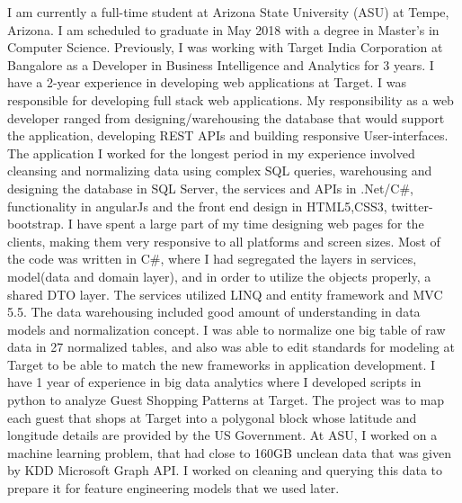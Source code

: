 \documentclass[11pt, a4paper]{awesome-cv}
\begin{document}
\makecvheader

\makelettertitle

\begin{cvletter}
I am currently a full-time student at Arizona State University (ASU) at Tempe, Arizona. I am scheduled to graduate in May 2018 with a degree in Master’s in Computer Science.
Previously, I was working with Target India Corporation at Bangalore as a Developer in Business Intelligence and Analytics for 3 years.
I have a 2-year experience in developing web applications at Target. I was responsible for developing full stack web applications.
My responsibility as a web developer ranged from designing/warehousing the database that would support the application, developing REST APIs and building responsive User-interfaces. The application I worked for the longest period
in my experience involved cleansing and normalizing data using complex SQL queries, warehousing and designing the database in SQL Server, the services and APIs in .Net/C\#, functionality in angularJs and the front end design in 
HTML5,CSS3, twitter-bootstrap. I have spent a large part of my time designing web pages for the clients, making them very responsive to all platforms and screen sizes. Most of the code was written in C\#, where I had segregated the 
layers in services, model(data and domain layer), and in order to utilize the objects properly, a shared DTO layer. The services utilized LINQ and entity framework and MVC 5.5.
The data warehousing included good amount of understanding in data models and normalization concept. I was able to normalize one big table of raw data in 27 normalized tables, and also was able to edit standards for modeling at 
Target to be able to match the new frameworks in application development.
I have 1 year of experience in big data analytics where I developed scripts in python to analyze Guest Shopping Patterns at Target. The project was to map each guest that shops at Target into a polygonal block whose latitude and 
longitude details are provided by the US Government. 
At ASU, I worked on a machine learning problem, that had close to 160GB unclean data that was given by KDD Microsoft Graph API. I worked on cleaning and querying this data to prepare it for feature engineering models that we used later.


\end{cvletter}
\end{document}
